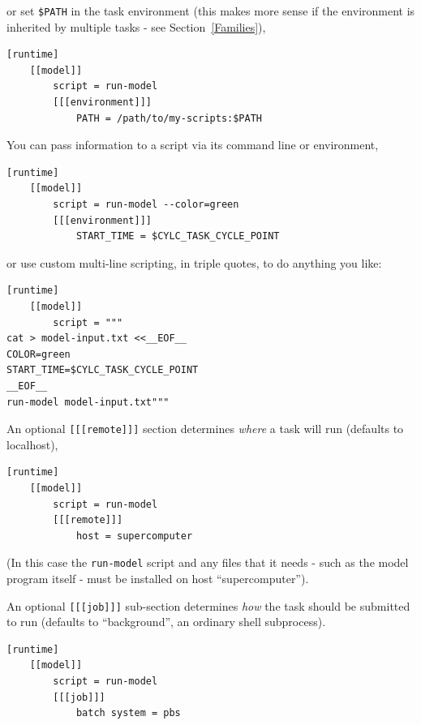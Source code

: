 or set \lstinline{$PATH} in the task environment (this makes more sense
if the environment is inherited by multiple tasks - see
Section~\ref{Families}),
\begin{lstlisting}[language=suiterc]
[runtime]
    [[model]]
        script = run-model
        [[[environment]]]
            PATH = /path/to/my-scripts:$PATH
\end{lstlisting}

You can pass information to a script via its command line or environment,

\begin{lstlisting}[language=suiterc]
[runtime]
    [[model]]
        script = run-model --color=green
        [[[environment]]]
            START_TIME = $CYLC_TASK_CYCLE_POINT
\end{lstlisting}

or use custom multi-line scripting, in triple quotes, to do anything you like:
\begin{lstlisting}[language=suiterc]
[runtime]
    [[model]]
        script = """
cat > model-input.txt <<__EOF__
COLOR=green
START_TIME=$CYLC_TASK_CYCLE_POINT
__EOF__
run-model model-input.txt"""
\end{lstlisting}

An optional \lstinline=[[[remote]]]= section determines {\em where} a task
will run (defaults to localhost), 

\begin{lstlisting}[language=suiterc]
[runtime]
    [[model]]
        script = run-model
        [[[remote]]]
            host = supercomputer
\end{lstlisting}
(In this case the \lstinline=run-model= script and any files that it needs -
such as the model program itself - must be installed on host ``supercomputer'').

An optional \lstinline=[[[job]]]= sub-section determines {\em how} the task
should be submitted to run (defaults to ``background'', an ordinary shell
subprocess).
\begin{lstlisting}[language=suiterc]
[runtime]
    [[model]]
        script = run-model
        [[[job]]]
            batch system = pbs
\end{lstlisting}


